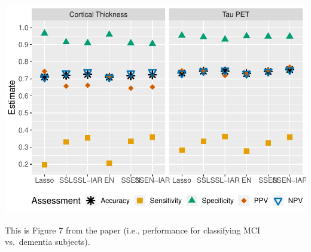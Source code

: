 \documentclass[
]{article}
\begin{document}
\includegraphics{analysis_details_files/figure-latex/unnamed-chunk-35-1.pdf}

This is Figure 7 from the paper (i.e., performance for classifying MCI
vs.~dementia subjects).
\end{document}
